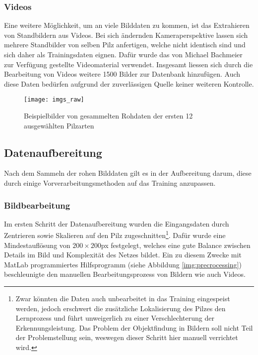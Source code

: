 \subsubsection{Videos}
Eine weitere Möglichkeit, um an viele Bilddaten zu kommen, ist das Extrahieren von Standbildern aus Videos. Bei sich ändernden Kameraperspektive lassen sich mehrere Standbilder von selben Pilz anfertigen, welche nicht identisch sind und sich daher als Trainingsdaten eignen. Dafür wurde das von Michael Bachmeier\cite{bachmeier} zur Verfügung gestellte Videomaterial verwendet. Insgesamt liessen sich durch die Bearbeitung von Videos weitere 1500 Bilder zur Datenbank hinzufügen. Auch diese Daten bedürfen aufgrund der zuverlässigen Quelle keiner weiteren Kontrolle.

\begin{figure}[h]
	\centering
	\texttt{[image: imgs\_raw]}
	\caption[Rohdaten]{Beispielbilder von gesammelten Rohdaten der ersten 12 ausgewählten Pilzarten}
	\label{img:raw_imgs}
\end{figure}

\newpage

\subsection{Datenaufbereitung} \label{cha:met:preprocessing}
Nach dem Sammeln der rohen Bilddaten gilt es in der Aufbereitung darum, diese durch einige Vorverarbeitungsmethoden auf das Training anzupassen.

\subsubsection{Bildbearbeitung}
Im ersten Schritt der Datenaufbereitung wurden die Eingangsdaten durch Zentrieren sowie Skalieren auf den Pilz zugeschnitten\footnote{Zwar könnten die Daten auch unbearbeitet in das Training eingespeist werden, jedoch erschwert die zusätzliche Lokalisierung des Pilzes den Lernprozess und führt unweigerlich zu einer Verschlechterung der Erkennungsleistung. Das Problem der Objektfindung in Bildern soll nicht Teil der Problemstellung sein, weswegen dieser Schritt hier manuell verrichtet wird.}. Dafür wurde eine Mindestauflösung von $200 \times 200$px festgelegt, welches eine gute Balance zwischen Details im Bild und Komplexität des Netzes bildet. Ein zu diesem Zwecke mit MatLab programmiertes Hilfsprogramm (siehe Abbildung \ref{img:precrocessing}) beschleunigte den manuellen Bearbeitungsprozess von Bildern wie auch Videos.


